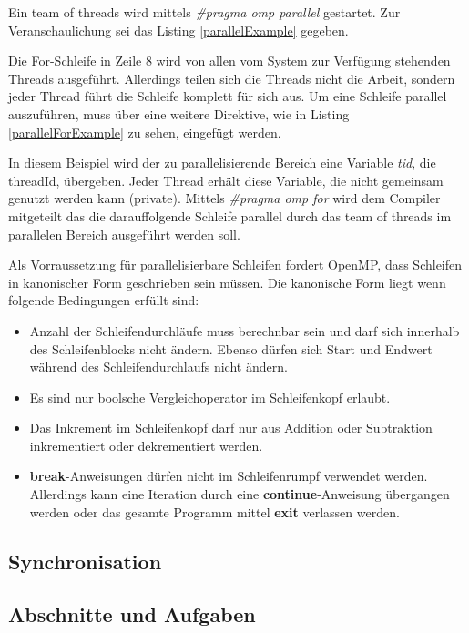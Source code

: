 \documentclass[11pt]{scrartcl}
\begin{document}
Ein team of threads wird mittels \textit{\#pragma omp parallel} gestartet. Zur Veranschaulichung sei das Listing \ref{parallelExample} gegeben. 


Die For-Schleife in Zeile 8 wird von allen vom System zur Verfügung stehenden Threads ausgeführt. Allerdings teilen sich die Threads nicht die Arbeit, sondern jeder Thread führt die Schleife komplett für sich aus. Um eine Schleife parallel auszuführen, muss über eine weitere Direktive, wie in Listing \ref{parallelForExample} zu sehen, eingefügt werden. 


In diesem Beispiel wird der zu parallelisierende Bereich eine Variable \textit{tid}, die threadId, übergeben. Jeder Thread erhält diese Variable, die nicht gemeinsam genutzt werden kann (private). Mittels \textit{\#pragma omp for} wird dem Compiler mitgeteilt das die darauffolgende Schleife parallel durch das team of threads  im parallelen Bereich ausgeführt werden soll.

Als Vorraussetzung für parallelisierbare Schleifen fordert OpenMP, dass Schleifen in kanonischer Form geschrieben sein müssen. Die kanonische Form liegt wenn folgende Bedingungen erfüllt sind: 
\begin{itemize}
\item Anzahl der Schleifendurchläufe muss berechnbar sein und darf sich innerhalb des Schleifenblocks nicht ändern. Ebenso dürfen sich Start und Endwert während des Schleifendurchlaufs nicht ändern.
\item Es sind nur boolsche Vergleichoperator im Schleifenkopf erlaubt.
\item Das Inkrement im Schleifenkopf darf nur aus Addition oder Subtraktion inkrementiert oder dekrementiert werden. 
\item \textbf{break}-Anweisungen dürfen nicht im Schleifenrumpf verwendet werden. Allerdings kann eine Iteration durch eine \textbf{continue}-Anweisung übergangen werden oder das gesamte Programm mittel \textbf{exit} verlassen werden.
\end{itemize}

\subsection{Synchronisation} 

\subsection{Abschnitte und Aufgaben}
\end{document}
